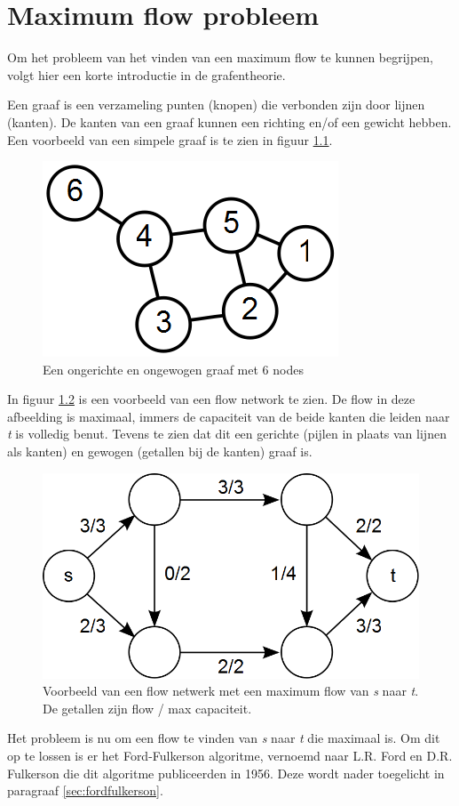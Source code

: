 \chapter{Maximum flow probleem}
\label{chap:maxFlowProblem}
Om het probleem van het vinden van een maximum flow te kunnen begrijpen, volgt hier een korte introductie in de grafentheorie.

Een graaf is een verzameling punten (knopen) die verbonden zijn door lijnen (kanten). De kanten van een graaf kunnen een richting en/of een gewicht hebben. Een voorbeeld van een simpele graaf is te zien in figuur \ref{fig:6ngraph}.

\begin{figure}[h]
	\includegraphics[width=0.5\linewidth]{maxflowproblem/6n-graph}
	\centering
	\caption{Een ongerichte en ongewogen graaf met 6 nodes}
	\label{fig:6ngraph}
\end{figure}

In figuur \ref{fig:flownetwork} is een voorbeeld van een flow network te zien. De flow in deze afbeelding is maximaal, immers de capaciteit van de beide kanten die leiden naar \textit{t} is volledig benut. Tevens te zien dat dit een gerichte (pijlen in plaats van lijnen als kanten) en gewogen (getallen bij de kanten) graaf is.

\begin{figure}[h]
\includegraphics[width=0.5\linewidth]{maxflowproblem/max_flow}%
\centering
\caption{Voorbeeld van een flow netwerk met een maximum flow van \textit{s} naar \textit{t}. De getallen zijn flow / max capaciteit.}%
\label{fig:flownetwork}%
\end{figure}

Het probleem is nu om een flow te vinden van \textit{s} naar \textit{t} die maximaal is. Om dit op te lossen is er het Ford-Fulkerson algoritme, vernoemd naar L.R. Ford en D.R. Fulkerson die dit algoritme publiceerden in 1956. Deze wordt nader toegelicht in paragraaf \ref{sec:fordfulkerson}.

